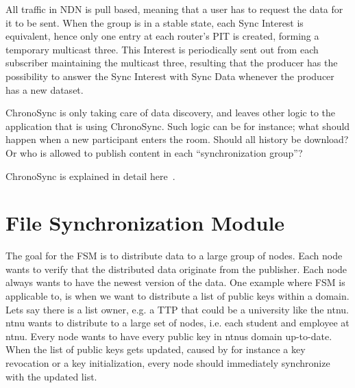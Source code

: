 All traffic in \gls{NDN} is pull based, meaning that a user has to request the data for it to be sent. 
When the group is in a stable state, each Sync Interest is equivalent, hence only one entry at each router's \gls{PIT} is created, forming a temporary multicast three.
This Interest is periodically sent out from each subscriber maintaining the multicast three, resulting that the producer has the possibility to answer the Sync Interest with Sync Data whenever the producer has a new dataset.

ChronoSync is only taking care of data discovery, and leaves other logic to the application that is using ChronoSync. 
Such logic can be for instance; what should happen when a new participant enters the room.
Should all history be download? 
Or who is allowed to publish content in each ``synchronization group''?


ChronoSync is explained in detail here~\cite{DBLP:conf/icnp/ZhuA13}.

\section{File Synchronization Module}\label{file-sync}
The goal for the \gls{FSM} is to distribute data to a large group of nodes.
Each node wants to verify that the distributed data originate from the publisher.
Each node always wants to have the newest version of the data. 
One example where \gls{FSM} is applicable to, is when we want to distribute a list of public keys within a domain.
Lets say there is a list owner, e.g. a \gls{TTP} that could be a university like the \gls{ntnu}.
\gls{ntnu} wants to distribute to a large set of nodes, i.e. each student and employee at \gls{ntnu}.
Every node wants to have every public key in \gls{ntnu}s domain up-to-date.
When the list of public keys gets updated, caused by for instance a key revocation or a key initialization, every node should immediately synchronize with the updated list.

